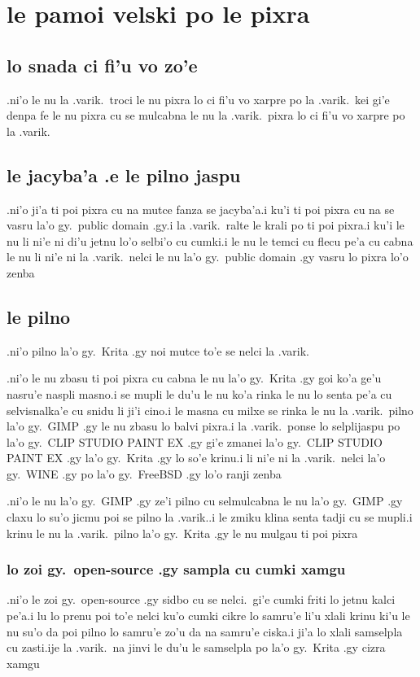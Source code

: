 \documentclass{report}
\begin{document}
\section{le pamoi velski po le pixra}
\subsection{lo snada ci fi'u vo zo'e}
.ni'o le nu la .varik.\ troci le nu pixra lo ci fi'u vo xarpre po la .varik.\ kei gi'e denpa fe le nu pixra cu se mulcabna le nu la .varik.\ pixra lo ci fi'u vo xarpre po la .varik.
\subsection{le jacyba'a .e le pilno jaspu}
.ni'o ji'a ti poi pixra cu na mutce fanza se jacyba'a\@  .i ku'i ti poi pixra cu na se vasru la'o gy.\ public domain .gy\@  .i la .varik.\ ralte le krali po ti poi pixra\@  .i ku'i le nu li ni'e ni di'u jetnu lo'o selbi'o cu cumki\@  .i le nu le temci cu flecu pe'a cu cabna le nu li ni'e ni la .varik.\ nelci le nu la'o gy.\ public domain .gy vasru lo pixra lo'o zenba

\subsection{le pilno}
.ni'o pilno la'o gy.\ Krita .gy noi mutce to'e se nelci la .varik.

.ni'o le nu zbasu ti poi pixra cu cabna le nu la'o gy.\ Krita .gy goi ko'a ge'u nasru'e naspli masno\@  .i se mupli le du'u le nu ko'a rinka le nu lo senta pe'a cu selvisnalka'e cu snidu li ji'i cino\@  .i le masna cu milxe se rinka le nu la .varik.\ pilno la'o gy.\ GIMP .gy le nu zbasu lo balvi pixra\@  .i la .varik.\ ponse lo selplijaspu po la'o gy.\ CLIP STUDIO PAINT EX .gy gi'e zmanei la'o gy.\ CLIP STUDIO PAINT EX .gy la'o gy.\ Krita .gy lo so'e krinu\@  .i li ni'e ni la .varik.\ nelci la'o gy.\ WINE .gy po la'o gy.\ FreeBSD .gy lo'o ranji zenba

.ni'o le nu la'o gy.\ GIMP .gy ze'i pilno cu selmulcabna le nu la'o gy.\ GIMP .gy claxu lo su'o jicmu poi se pilno la .varik.\@  .i le zmiku klina senta tadji cu se mupli\@  .i krinu le nu la .varik.\ pilno la'o gy.\ Krita .gy le nu mulgau ti poi pixra

\subsubsection{lo zoi gy.\ open-source .gy sampla cu cumki xamgu}
.ni'o le zoi gy.\ open-source .gy sidbo cu se nelci.\ gi'e cumki friti lo jetnu kalci pe'a\@\@  .i lu lo prenu poi to'e nelci ku'o cumki cikre lo samru'e li'u xlali krinu ki'u le nu su'o da poi pilno lo samru'e zo'u da na samru'e ciska\@\@  .i ji'a lo xlali samselpla cu zasti\@  .ije la .varik.\ na jinvi le du'u le samselpla po la'o gy.\ Krita .gy cizra xamgu
\end{document}
